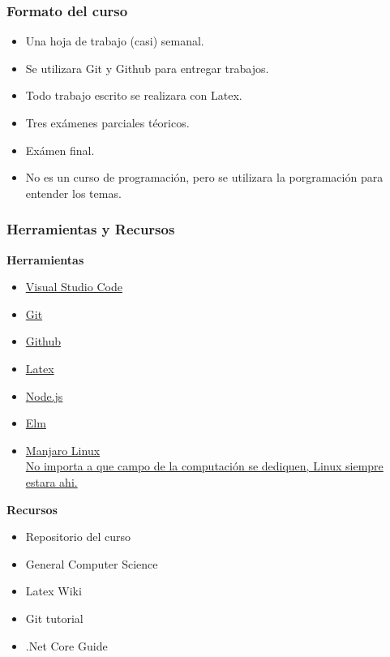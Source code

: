 \documentclass{beamer}
\begin{document}
\begin{frame}
    \frametitle{Formato del curso}
    \begin{itemize}
        \item{Una hoja de trabajo (casi) semanal.}
        \item{Se utilizara Git y Github para entregar trabajos.}
        \item{Todo trabajo escrito se realizara con Latex.}
        \item{Tres ex\'amenes parciales t\'eoricos.}
        \item{Ex\'amen final.}
        \item{No es un curso de programaci\'on, pero
        se utilizara la porgramaci\'on para entender los temas.}
    \end{itemize}
\end{frame}

\begin{frame}
\frametitle{Herramientas y Recursos}
\begin{multicols*}{2}
    {\bf Herramientas} \\
\begin{itemize}
    \item \href{https://code.visualstudio.com/}{Visual Studio Code}
    \item \href{https://git-scm.com/}{Git}
    \item \href{https://github.com/}{Github}
    \item \href{https://www.latex-project.org/}{Latex}
    \item \href{https://nodejs.org/en/}{Node.js}
    \item \href{http://elm-lang.org/}{Elm}
    \item \href{https://manjaro.org/}{Manjaro Linux\\
    \tiny{No importa a que campo de la computaci\'on se dediquen,
        Linux siempre estara ahi.}}
\end{itemize}
\columnbreak
{\bf Recursos}
\begin{itemize}
    \item{Repositorio del curso \cite{Repositorio}}
    \item{General Computer Science \cite{GenCS}}
    \item Latex Wiki \cite{Latex}
    \item Git tutorial \cite{GitTutorial}
    \item .Net Core Guide \cite{DotNetGuide}
\end{itemize}
\end{multicols*}
\end{frame}
\end{document}
